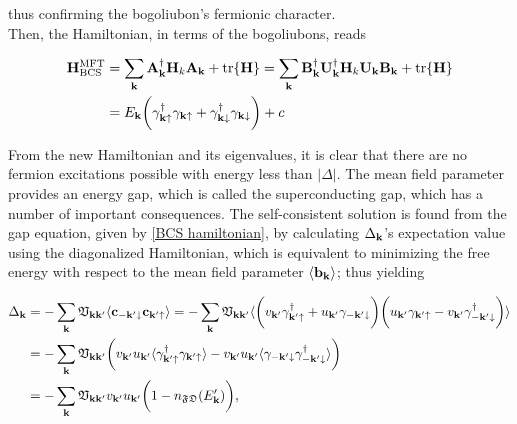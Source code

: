 \documentclass{homework}
\begin{document}
thus confirming the bogoliubon's fermionic character. \\

Then, the Hamiltonian, in terms of the bogoliubons, reads

\begin{equation}
\begin{split}
    {\bf H}_{\textnormal{BCS}}^{\textnormal{MFT}} &= \sum_{{\bf k}} {\bf A}_{{\bf k}}^\dagger {\bf H}_k {\bf A}_{{\bf k}} + \tr {\bf H} = \sum_{{\bf k}} {\bf B}_{{\bf k}}^\dagger {\bf U}_{{\bf k}}^\dagger {\bf H}_k {\bf U}_{{\bf k}} {\bf B}_{{\bf k}} + \tr {\bf H} \\
    &= E_{{\bf k}} \bigg(\gamma_{{\bf k} \uparrow}^\dagger \gamma_{{\bf k} \uparrow} + \gamma_{{\bf k} \downarrow}^\dagger \gamma_{{\bf k} \downarrow}\bigg) + c
\end{split}
\end{equation}

From the new Hamiltonian and its eigenvalues, it is clear that there are no fermion excitations possible with energy less than $|\Delta|$. The mean field parameter provides an energy gap, which is called the superconducting gap, which has a number of important consequences. The self-consistent solution is found from the gap equation, given by \cref{BCS hamiltonian}, by calculating $\Delta_{{\bf k}}$'s expectation value using the diagonalized Hamiltonian, which is equivalent to minimizing the free energy with respect to the mean field parameter $\langle {\bf b}_{{\bf k}} \rangle$; thus yielding

\begin{equation}
    \begin{split}
        \Delta_{{\bf k}} &= - \sum_{{\bf k}} \mathfrak{V}_{{\bf k}{\bf k}'} \langle {\bf c}_{-{\bf k}' \downarrow} {\bf c}_{{\bf k}' \uparrow} \rangle = - \sum_{{\bf k}} \mathfrak{V}_{{\bf k}{\bf k}'} \langle \bigg( v_{{\bf k}'} \gamma_{{\bf k}'\uparrow}^\dagger + u_{{\bf k}'} \gamma_{-{\bf k}'\downarrow}
        \bigg) \bigg(u_{{\bf k}'} \gamma_{{\bf k}'\uparrow} - v_{{\bf k}'} \gamma_{-{\bf k}'\downarrow}^\dagger
        \bigg) \rangle \\
        &= - \sum_{{\bf k}} \mathfrak{V}_{{\bf k}{\bf k}'} \bigg( v_{{\bf k}'} u_{{\bf k}'} \langle \gamma_{{\bf k}'\uparrow}^\dagger \gamma_{{\bf k}'\uparrow}\rangle - v_{{\bf k}'} u_{{\bf k}'} \langle \gamma_{-{\bf k}'\downarrow} \gamma_{-{\bf k}'\downarrow}^\dagger \rangle \bigg) \\
        &= - \sum_{{\bf k}} \mathfrak{V}_{{\bf k}{\bf k}'} v_{{\bf k}'} u_{{\bf k}'} \bigg(1 - n_{\mathfrak{F}\mathfrak{D}}(E_{\bf k}') \bigg),
    \end{split}
\end{equation}
\end{document}
